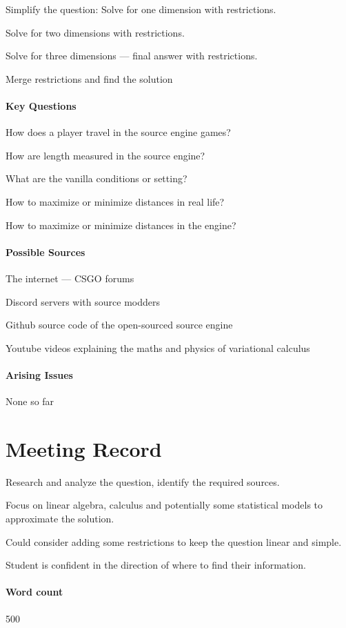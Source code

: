 \documentclass[a4paper,12pt]{article}
\begin{document}
Simplify the question: Solve for one dimension with restrictions.

Solve for two dimensions with restrictions.

Solve for three dimensions --- final answer with restrictions.

Merge restrictions and find the solution

\paragraph{Key Questions}
How does a player travel in the source engine games?

How are length measured in the source engine?

What are the vanilla conditions or setting?

How to maximize or minimize distances in real life?

How to maximize or minimize distances in the engine?

\paragraph{Possible Sources}
The internet --- CSGO forums

Discord servers with source modders

Github source code of the open-sourced source engine

Youtube videos explaining the maths and physics of variational calculus

\paragraph{Arising Issues}
None so far

\section{Meeting Record}
Research and analyze the question, identify the required sources.

Focus on linear algebra, calculus and potentially some statistical models to approximate the solution.

Could consider adding some restrictions to keep the question linear and simple.

Student is confident in the direction of where to find their information.

\paragraph{Word count} 500
\end{document}
